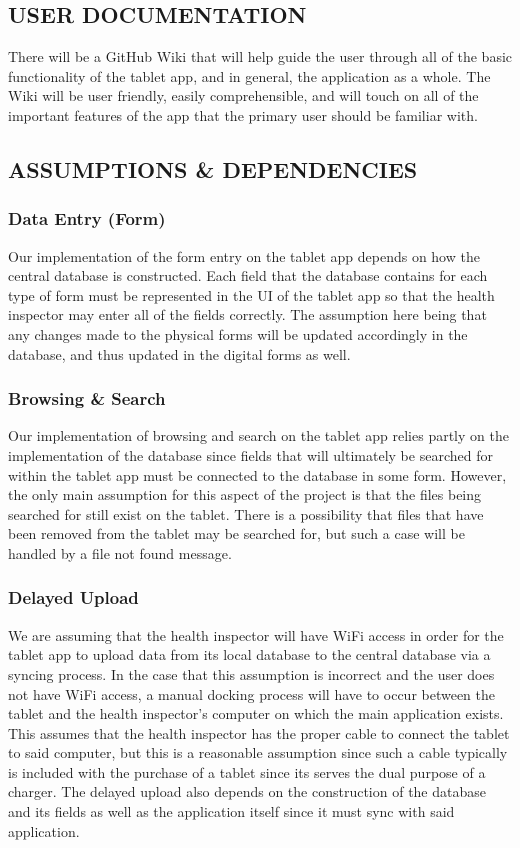 \documentclass[twoside,letterpaper]{article}
\begin{document}
\subsection[USER DOCUMENTATION]{\rmfamily\bfseries\color{black}
USER DOCUMENTATION}
{\rmfamily\color{black}
There will be a GitHub Wiki that will help guide the user through all of the basic functionality of the tablet app, and in general, the application as a whole. The Wiki will be user friendly, easily comprehensible, and will touch on all of the important features of the app that the primary user should be familiar with.}

\subsection[ASSUMPTIONS \& DEPENDENCIES]{\rmfamily\bfseries\color{black}
ASSUMPTIONS \& DEPENDENCIES}
\subsubsection{Data Entry (Form)}
Our implementation of the form entry on the tablet app depends on how the central database is constructed. Each field that the database contains for each type of form must be represented in the UI of the tablet app so that the health inspector may enter all of the fields correctly. The assumption here being that any changes made to the physical forms will be updated accordingly in the database, and thus updated in the digital forms as well. 
\subsubsection{Browsing \& Search}
Our implementation of browsing and search on the tablet app relies partly on the implementation of the database since fields that will ultimately be searched for within the tablet app must be connected to the database in some form. However, the only main assumption for this aspect of the project is that the files being searched for still exist on the tablet. There is a possibility that files that have been removed from the tablet may be searched for, but such a case will be handled by a file not found message. 
\subsubsection{Delayed Upload}
We are assuming that the health inspector will have WiFi access in order for the tablet app to upload data from its local database to the central database via a syncing process. In the case that this assumption is incorrect and the user does not have WiFi access, a manual docking process will have to occur between the tablet and the health inspector's computer on which the main application exists. This assumes that the health inspector has the proper cable to connect the tablet to said computer, but this is a reasonable assumption since such a cable typically is included with the purchase of a tablet since its serves the dual purpose of a charger. The delayed upload also depends on the construction of the database and its fields as well as the application itself since it must sync with said application.
\end{document}
